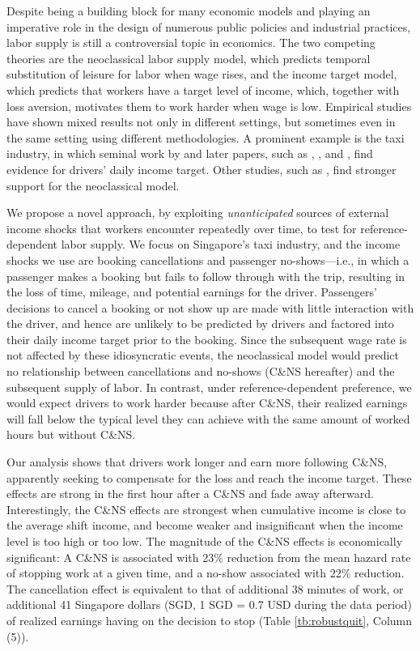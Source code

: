 \documentclass[reviewmode,AEJ]{AEA}
\begin{document}
\label{sec:intro}
Despite being a building block for many economic models and playing an imperative role in the 
design of numerous public policies and industrial practices, labor supply is still a controversial 
topic in economics. The two competing theories are the neoclassical labor supply model, which 
predicts temporal substitution of leisure for labor when wage rises, and the income target model, 
which predicts that workers have a target level of income, which, together with loss aversion, 
motivates them to work harder when wage is low. Empirical studies have shown mixed results not 
only in different settings, but sometimes even in the same setting using different methodologies.
A prominent example is the taxi industry, in which seminal work by \citet{camerer1997labor} and 
later papers, such as \citet{crawford2011new}, \citet{martin2017quit}, and \citet{thakral2018daily}, 
find evidence for drivers' daily income target. Other studies, such as 
\citet{farber2005tomorrow,farber2015you}, find stronger support for the neoclassical model.


We propose a novel approach, by exploiting \textit{unanticipated} sources of external 
income shocks that workers encounter repeatedly over time, to test for reference-dependent labor supply.
We focus on Singapore's taxi industry, and the income shocks we use are 
booking cancellations and passenger no-shows---i.e., in which a passenger makes a booking but fails 
to follow through with the trip, resulting in the loss of time, mileage, and potential earnings %
 for the driver. Passengers' decisions to cancel a booking or not show up are made with 
little interaction with the driver, and hence are unlikely to be predicted by drivers and factored 
into their daily income target prior to the booking. Since the subsequent wage rate is not affected 
by these idiosyncratic events, the neoclassical model would predict no relationship between cancellations 
and no-shows (C\&NS hereafter) and the subsequent supply of labor. In contrast, under reference-dependent 
preference, we would expect drivers to work harder because after C\&NS, their realized earnings will fall 
below the typical level they can achieve with the same amount of worked hours but without C\&NS. 

Our analysis shows that drivers work longer and earn more following 
C\&NS, apparently seeking to compensate for the loss and reach the income target. 
These effects are strong in the first hour after a 
C\&NS and fade away afterward. Interestingly, the C\&NS effects are strongest when cumulative income 
is %
 close to the average shift income, and become weaker and insignificant when the income 
level is too high or too low. 
% 
The magnitude of the C\&NS effects is economically significant: A C\&NS
is associated with 23\% reduction from the mean hazard rate of stopping work at a given time, and a no-show associated with 22\% reduction. 
The cancellation effect is equivalent to that of additional 38 minutes of work, or additional 41 Singapore dollars 
(SGD, 1 SGD = 0.7 USD during the data period) of realized earnings having on the decision to stop 
(Table \ref{tb:robustquit}, Column (5)). 
\end{document}
